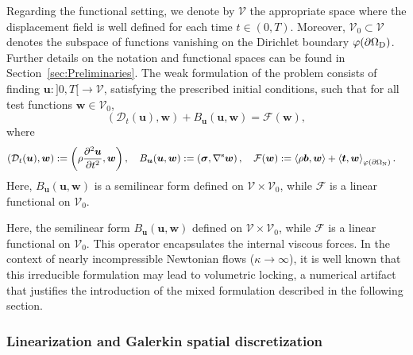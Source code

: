 \documentclass[11pt,english]{article}
\def\disp{\boldsymbol{u}}
\def\stress{\boldsymbol{\sigma}}
\def\SpaceDisp{\boldsymbol{\mathcal{V}}}
\def\Birreducible{B_{\disp}}
\begin{document}
    Regarding the functional setting, we denote by $\SpaceDisp$ the appropriate space where the displacement field is well defined for each time $t \in (0,T)$. Moreover, $\SpaceDisp_0 \subset \SpaceDisp$ denotes the subspace of functions vanishing on the Dirichlet boundary $\varphi(\partial\Omega_{\rm D})$. Further details on the notation and functional spaces can be found in Section~\ref{sec:Preliminaries}. The weak formulation of the problem consists of finding $\disp : ]0,T[ \rightarrow \SpaceDisp$, satisfying the prescribed initial conditions, such that for all test functions $\boldsymbol{w} \in \SpaceDisp_0$,
    \begin{equation}
        \left(\mathcal{D}_t(\disp), \boldsymbol{w}\right)
        + \Birreducible(\disp,\boldsymbol{w})
        = \mathcal{F}(\boldsymbol{w}),
        \label{eq:variational_in_compact_form_irr}
    \end{equation}
    where
    \begin{align}
        \left(\mathcal{D}_t(\disp), \boldsymbol{w}\right) := \left(\rho \frac{\partial^2 \disp}{\partial t^2}, \boldsymbol{w}\right), \quad 
        \Birreducible(\disp,\boldsymbol{w}) := \left(\stress, \nabla^{\rm s} \boldsymbol{w}\right), \label{eq:bilinear_form_irr} \quad
        \mathcal{F}(\boldsymbol{w}) &:= \left\langle \rho \boldsymbol{b}, \boldsymbol{w} \right\rangle
        + \left\langle \boldsymbol{t}, \boldsymbol{w} \right\rangle_{\varphi(\partial\Omega_{\rm N})}.
    \end{align}
    Here, $\Birreducible(\disp,\boldsymbol{w})$ is a semilinear form defined on $\SpaceDisp \times \SpaceDisp_0$, while $\mathcal{F}$ is a linear functional on $\SpaceDisp_0$.

    Here, the semilinear form $\Birreducible(\disp,\boldsymbol{w})$ defined on $\SpaceDisp \times \SpaceDisp_0$, while $\mathcal{F}$ is a linear functional on $\SpaceDisp_0$. This operator encapsulates the internal viscous forces. In the context of nearly incompressible Newtonian flows ($\kappa \to \infty$), it is well known that this irreducible formulation may lead to volumetric locking, a numerical artifact that justifies the introduction of the mixed formulation described in the following section.


\subsubsection{Linearization and Galerkin spatial discretization} \label{subsec:Irr_Linearization}
    
\end{document}
